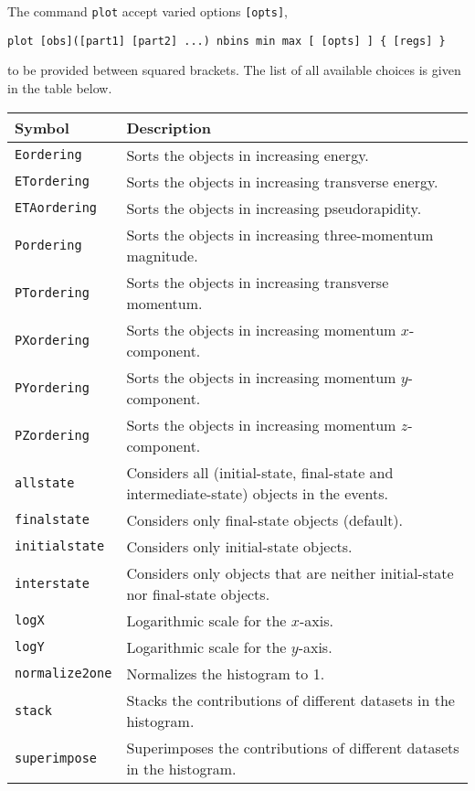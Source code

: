 \documentclass[a4paper]{article}
\begin{document}
\noindent The command \verb+plot+ accept varied options \verb+[opts]+,
{\color{ao} \begin{verbatim}
plot [obs]([part1] [part2] ...) nbins min max [ [opts] ] { [regs] }
\end{verbatim}}
to be provided between squared brackets. The list of all available choices is
given in the table below.
\renewcommand{\arraystretch}{1.2}%
\begin{center}\begin{tabular}{l p{9.4cm}}
\hline
Symbol& Description\\
\hline
\color{ao} \verb?Eordering?     & Sorts the objects in increasing energy.\\
\color{ao} \verb?ETordering?    & Sorts the objects in increasing transverse energy.\\
\color{ao} \verb?ETAordering?   & Sorts the objects in increasing pseudorapidity.\\
\color{ao} \verb?Pordering?     & Sorts the objects in increasing three-momentum magnitude.
  \\
\color{ao} \verb?PTordering?    & Sorts the objects in increasing transverse momentum.\\
\color{ao} \verb?PXordering?    & Sorts the objects in increasing momentum $x$-component.\\
\color{ao} \verb?PYordering?    & Sorts the objects in increasing momentum $y$-component.\\
\color{ao} \verb?PZordering?    & Sorts the objects in increasing momentum $z$-component.\\
\color{ao} \verb?allstate?      & Considers all (initial-state, final-state and
  intermediate-state) objects in the events.\\
\color{ao} \verb?finalstate?    & Considers only final-state objects (default).\\
\color{ao} \verb?initialstate?  & Considers only initial-state objects.\\
\color{ao} \verb?interstate?    & Considers only objects that are neither initial-state nor
  final-state objects.\\
\color{ao} \verb?logX?          & Logarithmic scale for the $x$-axis.\\
\color{ao} \verb?logY?          & Logarithmic scale for the $y$-axis.\\
\color{ao} \verb?normalize2one? & Normalizes the histogram to 1.\\
\color{ao} \verb?stack?         & Stacks the contributions of different datasets in the
  histogram.\\
\color{ao} \verb?superimpose?   & Superimposes the contributions of different datasets in
  the histogram.\\
\hline
\end{tabular}
\end{center}
\end{document}
